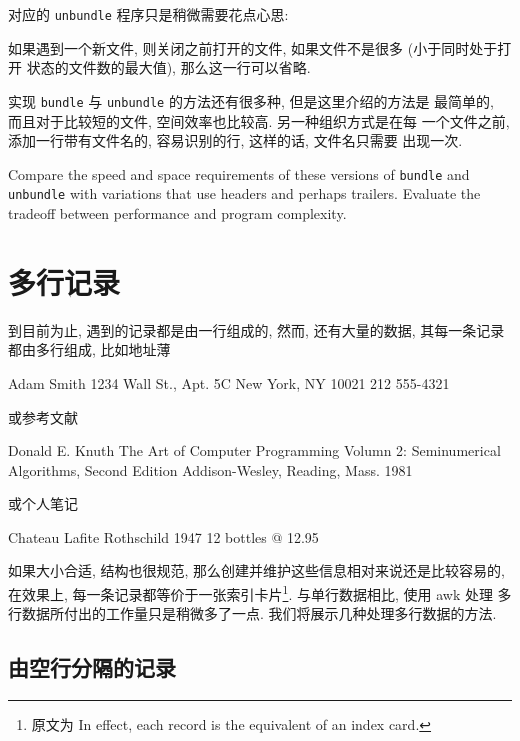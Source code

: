 \begin{shell}
对应的 \verb'unbundle' 程序只是稍微需要花点心思:
如果遇到一个新文件, 则关闭之前打开的文件, 如果文件不是很多 (小于同时处于打开
状态的文件数的最大值), 那么这一行可以省略.

实现 \verb'bundle' 与 \verb'unbundle' 的方法还有很多种, 但是这里介绍的方法是
最简单的, 而且对于比较短的文件, 空间效率也比较高. 另一种组织方式是在每
一个文件之前, 添加一行带有文件名的, 容易识别的行, 这样的话, 文件名只需要
出现一次.

\begin{exercise}
    Compare the speed and space requirements of these versions of
    \verb'bundle' and \verb'unbundle' with variations that use headers and
    perhaps trailers. Evaluate the tradeoff between performance and program
    complexity.
\end{exercise}

\section{多行记录}
\label{sec:multiline_records}

到目前为止, 遇到的记录都是由一行组成的, 然而, 还有大量的数据, 其每一条记录
都由多行组成, 比如地址薄
\begin{shell}
    Adam Smith
    1234 Wall St., Apt. 5C
    New York, NY 10021
    212 555-4321
\end{shell}
或参考文献
\begin{shell}
    Donald E. Knuth
    The Art of Computer Programming
    Volumn 2: Seminumerical Algorithms, Second Edition
    Addison-Wesley, Reading, Mass.
    1981
\end{shell}
或个人笔记
\begin{shell}
    Chateau Lafite Rothschild 1947
    12 bottles @ 12.95
\end{shell}

如果大小合适, 结构也很规范, 那么创建并维护这些信息相对来说还是比较容易的,
在效果上, 每一条记录都等价于一张索引卡片\footnote{原文为 In effect, each
record is the equivalent of an index card.}. 与单行数据相比, 使用 awk 处理 
多行数据所付出的工作量只是稍微多了一点. 我们将展示几种处理多行数据的方法.

\subsection{由空行分隔的记录}
\label{subsec:records_separated_by_blank_lines}


\end{shell}
